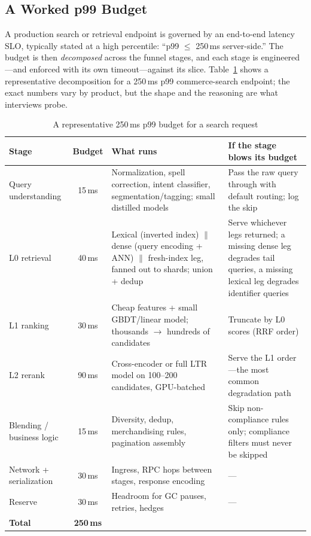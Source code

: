 \subsection{A Worked p99 Budget}

A production search or retrieval endpoint is governed by an end-to-end latency SLO, typically stated at a high percentile: ``p99 $\leq$ 250\,ms server-side.'' The budget is then \textit{decomposed} across the funnel stages, and each stage is engineered---and enforced with its own timeout---against its slice. Table~\ref{sr:tab:latency_budget} shows a representative decomposition for a 250\,ms p99 commerce-search endpoint; the exact numbers vary by product, but the shape and the reasoning are what interviews probe.

\begin{table}[H]
\centering
\small
\caption{A representative 250\,ms p99 budget for a search request}
\label{sr:tab:latency_budget}
\begin{tabularx}{\textwidth}{lcXX}
\toprule
\textbf{Stage} & \textbf{Budget} & \textbf{What runs} & \textbf{If the stage blows its budget} \\
\midrule
Query understanding & 15\,ms & Normalization, spell correction, intent classifier, segmentation/tagging; small distilled models & Pass the raw query through with default routing; log the skip \\
L0 retrieval & 40\,ms & Lexical (inverted index) $\parallel$ dense (query encoding + ANN) $\parallel$ fresh-index leg, fanned out to shards; union + dedup & Serve whichever legs returned; a missing dense leg degrades tail queries, a missing lexical leg degrades identifier queries \\
L1 ranking & 30\,ms & Cheap features + small GBDT/linear model; thousands $\to$ hundreds of candidates & Truncate by L0 scores (RRF order) \\
L2 rerank & 90\,ms & Cross-encoder or full LTR model on 100--200 candidates, GPU-batched & Serve the L1 order---the most common degradation path \\
Blending / business logic & 15\,ms & Diversity, dedup, merchandising rules, pagination assembly & Skip non-compliance rules only; compliance filters must never be skipped \\
Network + serialization & 30\,ms & Ingress, RPC hops between stages, response encoding & --- \\
Reserve & 30\,ms & Headroom for GC pauses, retries, hedges & --- \\
\midrule
\textbf{Total} & \textbf{250\,ms} & & \\
\bottomrule
\end{tabularx}
\end{table}

